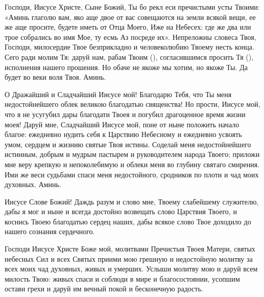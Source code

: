 \mychapterending


\begin{mymulticols}



Господи, Иисусе Христе, Сыне Божий, Ты бо рекл еси пречистыми усты Твоими: «Аминь глаголю вам, яко аще двое от вас совещаются на земли всякой вещи, ее же аще просите, будете иметь от Отца Моего, Иже на Небесех: где же два или трое собрались во имя Мое, ту есмь Аз посреде их». Непреложны словеса Твоя, Господи, милосердие Твое безприкладно и человеколюбию Твоему несть конца. Сего ради молим Тя: даруй нам, рабам Твоим (), согласившимся просить Тя (), исполнения нашего прошения. Но обаче не якоже мы хотим, но якоже Ты. Да будет во веки воля Твоя. Аминь.

\end{mymulticols}

\mychapterending


\begin{mymulticols}




О Дражайший и Сладчайший Иисусе мой! Благодарю Тебя, что Ты меня недостойнейшего облек великою благодатью священства! Но прости, Иисусе мой, что я не усугубил дары благодати Твоея и погубил драгоценное время жизни моея! Даруй мне, Сладчайший Иисусе мой, поне от ныне положить начало благое: ежедневно нудить себя к Царствию Небесному и ежедневно усвоять умом, сердцем и жизнию святые Твоя истины. Соделай меня недостойнейшего истинным, добрым и мудрым пастырем и руководителем народа Твоего; приложи мне веру крепкую и непоколебимую и облеки меня во глубину святаго смирения. Ими же веси судьбами спаси меня недостойного, сродников по плоти и чад моих духовных. Аминь.

\end{mymulticols}

\mychapterending


\begin{mymulticols}




Иисусе Слове Божий! Даждь разум и слово мне, Твоему слабейшему служителю, дабы я мог и ныне и всегда достойно возвещать слово Царствия Твоего, и коснись Твоею благодатью сердец наших, дабы всякое слово Твое доходило до нашего сознания сердечного.


Господи Иисусе Христе Боже мой, молитвами Пречистыя Твоея Матери, святых небесных Сил и всех Святых приими мою грешную и недостойную молитву за всех моих чад духовных, живых и умерших. Услыши молитву мою и даруй всем милость Твою: живых спаси и соблюди в мире и благосостоянии, усопшим остави грехи и даруй им вечный покой и бесконечную радость.




\end{mymulticols}

